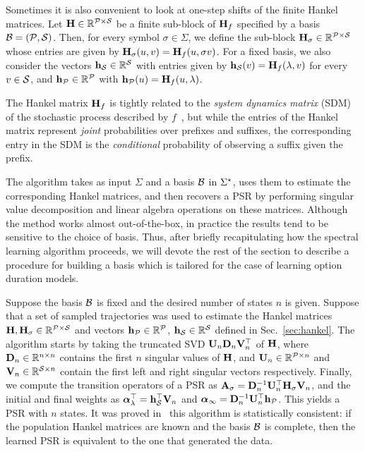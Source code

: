 Sometimes it is also convenient to look at one-step shifts of the finite
Hankel matrices.
%
Let $\mathbf{H} \in \mathbb{R}^{\mathcal{P} \times \mathcal{S}}$ be a finite sub-block of
$\mathbf{H}_f$ specified by a basis $\mathcal{B} = (\mathcal{P},\mathcal{S})$.
%
Then, for every symbol $\sigma \in \Sigma$, we define the sub-block $\mathbf{H}_\sigma \in
\mathbb{R}^{\mathcal{P} \times \mathcal{S}}$ whose entries are given by $\mathbf{H}_\sigma(u,v) = \mathbf{H}_f(u,\sigma
v)$.
%
For a fixed basis, we also consider the vectors $\mathbf{h}_{\mathcal{S}}
\in \mathbb{R}^{\mathcal{S}}$ with entries given by $\mathbf{h}_{\mathcal{S}}(v) = \mathbf{H}_f(\lambda,v)$
for every $v \in \mathcal{S}$, and $\mathbf{h}_{\mathcal{P}} \in \mathbb{R}^{\mathcal{P}}$ with $\mathbf{h}_{\mathcal{P}}(u) =
\mathbf{H}_f(u,\lambda)$.

The Hankel matrix $\mathbf{H}_f$ is tightly related to the \emph{system dynamics matrix}
(SDM) of the stochastic process described by $f$~\cite{singh04}, but while the entries of the
Hankel matrix represent \emph{joint} probabilities over prefixes and suffixes,
the corresponding entry in the SDM is the \emph{conditional} probability of
observing a suffix given the prefix.


The algorithm takes as input $\Sigma$ and a basis
$\mathcal{B}$ in $\Sigma^\star$, uses them to estimate the corresponding Hankel matrices, and
then recovers a PSR by performing singular value decomposition and
linear algebra operations on these matrices.
%
%
Although the method works almost out-of-the-box, in practice the results tend
to be sensitive to the choice of basis.
%
Thus, after briefly recapitulating how the spectral learning algorithm proceeds,
we will devote the rest of the section to describe a procedure for building a
basis which is tailored for the case of learning option duration models.


Suppose the basis $\mathcal{B}$ is fixed and the desired number of states $n$ is given.
%
Suppose that a set of sampled trajectories was used to estimate the
Hankel matrices $\mathbf{H}, \mathbf{H}_\sigma \in \mathbb{R}^{\mathcal{P} \times \mathcal{S}}$ and vectors
$\mathbf{h}_{\mathcal{P}} \in \mathbb{R}^{\mathcal{P}}$, $\mathbf{h}_{\mathcal{S}} \in \mathbb{R}^{\mathcal{S}}$ defined in
Sec.~\ref{sec:hankel}.
%
The algorithm starts by taking the truncated SVD $\mathbf{U}_n \mathbf{D}_n
\mathbf{V}_n^\top$ of $\mathbf{H}$, where $\mathbf{D}_n \in \mathbb{R}^{n \times n}$ contains the first
$n$ singular values of $\mathbf{H}$, and $\mathbf{U}_n \in \mathbb{R}^{\mathcal{P} \times n}$ and $\mathbf{V}_n
\in \mathbb{R}^{\mathcal{S} \times n}$ contain the first left and right singular vectors
respectively.
%
Finally, we compute the transition operators of a PSR as $\mathbf{A}_\sigma =
\mathbf{D}_n^{-1} \mathbf{U}_n^\top \mathbf{H}_\sigma \mathbf{V}_n$, and the initial and final
weights as $\boldsymbol{\alpha}_\lambda^\top = \mathbf{h}_{\mathcal{S}}^\top \mathbf{V}_n$ and $\boldsymbol{\alpha}_{\infty} =
\mathbf{D}_n^{-1} \mathbf{U}_n^\top \mathbf{h}_{\mathcal{P}}$.
%
This yields a PSR with $n$ states. It was proved in~\cite{bootspsr} this
algorithm is statistically consistent: if the population Hankel matrices are
known and the basis $\mathcal{B}$ is complete, then the learned PSR is equivalent to the
one that generated the data.


